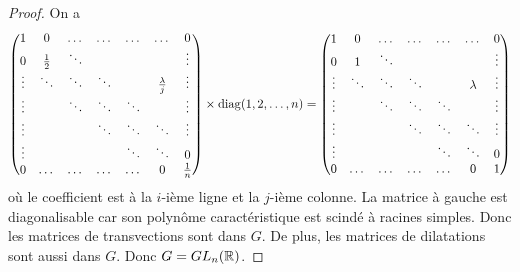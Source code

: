 \documentclass[12pt]{article}
\begin{document}
\begin{proof}
	On a 
	\begin{equation}
		\begin{pmatrix}
			1 &0 &\dots&\dots&\dots&\dots&0\\
			0&\frac{1}{2}&\ddots&&&&\vdots\\
			\vdots&\ddots & \ddots &\ddots &&\frac{\lambda}{j}&\vdots\\
			\vdots&& \ddots & \ddots &\ddots&&\vdots\\
			\vdots&&&\ddots&\ddots&\ddots&\vdots\\
			\vdots&&&&\ddots&\ddots&0\\
			0&\dots&\dots&\dots&\dots&0&\frac{1}{n}\\
		\end{pmatrix}
		\times\operatorname{diag}(1,2,\dots,n)
		=
		\begin{pmatrix}
			1 &0 &\dots&\dots&\dots&\dots&0\\
			0&1&\ddots&&&&\vdots\\
			\vdots&\ddots & \ddots &\ddots &&\lambda&\vdots\\
			\vdots&& \ddots & \ddots &\ddots&&\vdots\\
			\vdots&&&\ddots&\ddots&\ddots&\vdots\\
			\vdots&&&&\ddots&\ddots&0\\
			0&\dots&\dots&\dots&\dots&0&1\\
		\end{pmatrix}
	\end{equation}
	où le coefficient est à la $i$-ième ligne et la $j$-ième colonne. La matrice à gauche est diagonalisable car son polynôme caractéristique est scindé à racines simples. Donc les matrices de transvections sont dans $G$. De plus, les matrices de dilatations sont aussi dans $G$. Donc $G=GL_{n}(\mathbb{R})$.
\end{proof}
\end{document}
